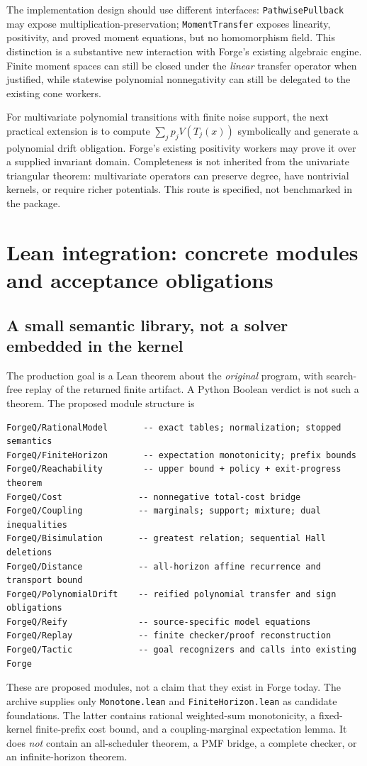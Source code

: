 \documentclass[11pt,letterpaper]{article}
\theoremstyle{definition}\newtheorem{definition}[theorem]{Definition}
\theoremstyle{remark}\newtheorem{remark}[theorem]{Remark}
\newcommand{\code}[1]{\texttt{#1}}
\begin{document}
The implementation design should use different interfaces: \code{PathwisePullback} may expose multiplication-preservation; \code{MomentTransfer} exposes linearity, positivity, and proved moment equations, but no homomorphism field. This distinction is a substantive new interaction with Forge's existing algebraic engine. Finite moment spaces can still be closed under the \emph{linear} transfer operator when justified, while statewise polynomial nonnegativity can still be delegated to the existing cone workers.

For multivariate polynomial transitions with finite noise support, the next practical extension is to compute $\sum_jp_jV(T_j(x))$ symbolically and generate a polynomial drift obligation. Forge's existing positivity workers may prove it over a supplied invariant domain. Completeness is not inherited from the univariate triangular theorem: multivariate operators can preserve degree, have nontrivial kernels, or require richer potentials. This route is specified, not benchmarked in the package.

\section{Lean integration: concrete modules and acceptance obligations}
\subsection{A small semantic library, not a solver embedded in the kernel}
The production goal is a Lean theorem about the \emph{original} program, with search-free replay of the returned finite artifact. A Python Boolean verdict is not such a theorem. The proposed module structure is
\begin{lstlisting}
ForgeQ/RationalModel       -- exact tables; normalization; stopped semantics
ForgeQ/FiniteHorizon       -- expectation monotonicity; prefix bounds
ForgeQ/Reachability        -- upper bound + policy + exit-progress theorem
ForgeQ/Cost               -- nonnegative total-cost bridge
ForgeQ/Coupling           -- marginals; support; mixture; dual inequalities
ForgeQ/Bisimulation       -- greatest relation; sequential Hall deletions
ForgeQ/Distance           -- all-horizon affine recurrence and transport bound
ForgeQ/PolynomialDrift    -- reified polynomial transfer and sign obligations
ForgeQ/Reify              -- source-specific model equations
ForgeQ/Replay             -- finite checker/proof reconstruction
ForgeQ/Tactic             -- goal recognizers and calls into existing Forge
\end{lstlisting}
These are proposed modules, not a claim that they exist in Forge today. The archive supplies only \code{Monotone.lean} and \code{FiniteHorizon.lean} as candidate foundations. The latter contains rational weighted-sum monotonicity, a fixed-kernel finite-prefix cost bound, and a coupling-marginal expectation lemma. It does \emph{not} contain an all-scheduler theorem, a PMF bridge, a complete checker, or an infinite-horizon theorem.
\end{document}
